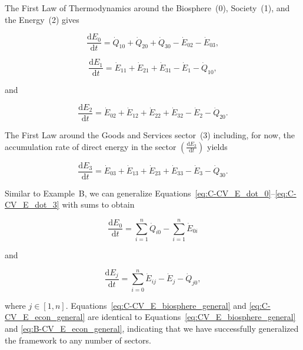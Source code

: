 The First Law of Thermodynamics around the 
Biosphere~(0), Society~(1), and the Energy~(2) gives

\begin{equation} \label{eq:C-CV_E_dot_0}
	\frac{\mathrm{d}E_{0}}{\mathrm{d}t} 	 
	= \dot{Q}_{10} 
	+ \dot{Q}_{20} 
	+ \dot{Q}_{30} 
	- \dot{E}_{02} 
	- \dot{E}_{03},
\end{equation}

\begin{equation} \label{eq:C-CV_E_dot_1}
	\frac{\mathrm{d}E_{1}}{\mathrm{d}t}
	= \dot{E}_{11}
	+ \dot{E}_{21}  
	+ \dot{E}_{31} 
	- \dot{E}_{1}
	- \dot{Q}_{10},
\end{equation}

\noindent and 

\begin{equation} \label{eq:C-CV_E_dot_2}
	\frac{\mathrm{d}E_{2}}{\mathrm{d}t} 	 
	= \dot{E}_{02} 
	+ \dot{E}_{12}
	+ \dot{E}_{22} 
	+ \dot{E}_{32} 
	- \dot{E}_{2} 
	- \dot{Q}_{20}.
\end{equation}

The First Law around the Goods and Services sector~(3) including, 
for now, the accumulation rate of direct energy in the sector 
$\left(\frac{\mathrm{d}E_{3}}{\mathrm{d}t}\right)$ yields

\begin{equation} \label{eq:C-CV_E_dot_3}
	\frac{\mathrm{d}E_{3}}{\mathrm{d}t} 
	= \dot{E}_{03} 
	+ \dot{E}_{13}
	+ \dot{E}_{23} 
	+ \dot{E}_{33} 
	- \dot{E}_3 
	- \dot{Q}_{30}.
\end{equation}

Similar to Example~B, we can generalize 
Equations~\ref{eq:C-CV_E_dot_0}--\ref{eq:C-CV_E_dot_3}
with sums to obtain

\begin{equation} \label{eq:C-CV_E_biosphere_general}
	\frac{\mathrm{d}E_{0}}{\mathrm{d}t} 	 
	= \sum\limits_{i=1}^n \dot{Q}_{i0} - \sum\limits_{i=1}^n \dot{E}_{0i}
\end{equation}

\noindent and

\begin{equation} \label{eq:C-CV_E_econ_general}
	\frac{\mathrm{d}E_{j}}{\mathrm{d}t} 
	= \sum\limits_{i=0}^n\dot{E}_{ij} 
	- \dot{E}_{j}  
	- \dot{Q}_{j0},
\end{equation}

\noindent where $j \in [1, n]$. 
Equations~\ref{eq:C-CV_E_biosphere_general} and 
\ref{eq:C-CV_E_econ_general} are identical to 
Equations~\ref{eq:CV_E_biosphere_general} and 
\ref{eq:B-CV_E_econ_general}, 
indicating that we have successfully generalized 
the framework to any number of sectors.

